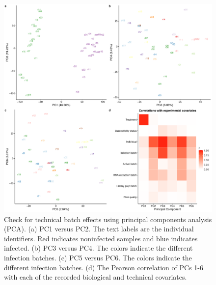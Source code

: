 \documentclass[fleqn,10pt]{wlscirep}
\begin{document}
\begin{figure}[ht]
\centering
\includegraphics[width=\linewidth]{../figure/batch-pca.pdf}
\caption{
Check for technical batch effects using principal components analysis
(PCA). (a) PC1 versus PC2. The text labels are the individual
identifiers. Red indicates noninfected samples and blue indicates
infected. (b) PC3 versus PC4. The colors indicate the different
infection batches. (c) PC5 versus PC6. The colors indicate the
different infection batches. (d) The Pearson correlation of PCs 1-6
with each of the recorded biological and technical covariates.
}
\label{fig:batch}
\end{figure}
\end{document}
